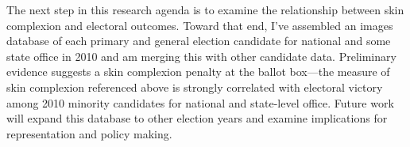 \documentclass[12pt]{article}
\begin{document}
The next step in this research agenda is to examine the relationship between skin complexion and electoral outcomes.  Toward that end, I've assembled an images database of each primary and general election candidate for national and some state office in 2010 and am merging this with other candidate data.  Preliminary evidence suggests a skin complexion penalty at the ballot box---the measure of skin complexion referenced above is strongly correlated with electoral victory among 2010 minority candidates for national and state-level office.  Future work will expand this database to other election years and examine implications for representation and policy making.  %

\end{document}
